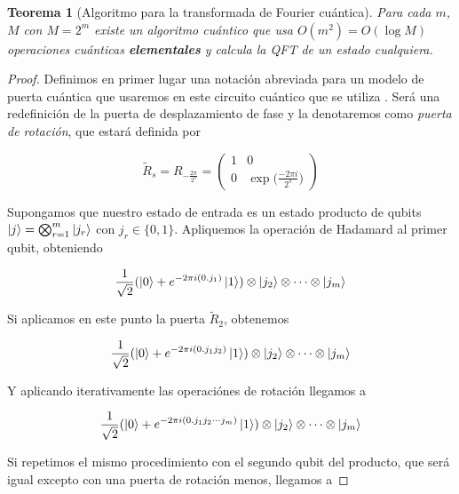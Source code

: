 \documentclass[11pt, spanish]{report}
\numberwithin{equation}{section}
\newtheorem{teo}[defin]{Teorema}
\numberwithin{defin}{section}
\newenvironment{yellowBox}{\begin{tcolorbox}[colback=yellow!5!white,colframe=yellow!75!black]}{\end{tcolorbox}}
\begin{document}
\begin{yellowBox}
\begin{teo}[Algoritmo para la transformada de Fourier cuántica]
Para cada $m$, $M$ con $M=2^m$ existe un algoritmo cuántico que usa $O(m^2)=O(\log M)$ operaciones cuánticas \textbf{elementales} y calcula la QFT de un estado cualquiera.
\end{teo}
\end{yellowBox}

\begin{proof}

Definimos en primer lugar una notación abreviada para un modelo de puerta cuántica que usaremos en este circuito cuántico que se utiliza \cite{shor}. Será una redefinición de la puerta de desplazamiento de fase y la denotaremos como \emph{puerta de rotación}, que estará definida por

\begin{equation}
\tilde{R}_s=R_{-\frac{2\pi}{2^s}}=\begin{pmatrix}
1 & 0 \\
0 & \exp\Big(\frac{-2\pi i}{2^s}\Big)
\end{pmatrix}
\end{equation}

Supongamos que nuestro estado de entrada es un estado producto de qubits $\ket{j}=\bigotimes_{r=1}^m\ket{j_r}$ con $j_r\in\{0,1\}$. Apliquemos la operación de Hadamard al primer qubit, obteniendo

\begin{equation}
\frac{1}{\sqrt{2}}(\ket{0}+e^{-2\pi i(0.j_1)}\ket{1})\otimes\ket{j_2}\otimes\cdots\otimes\ket{j_m}
\end{equation}

Si aplicamos en este punto la puerta $\tilde{R}_2$, obtenemos

\begin{equation}
\frac{1}{\sqrt{2}}(\ket{0}+e^{-2\pi i(0.j_1j_2)}\ket{1})\otimes\ket{j_2}\otimes\cdots\otimes\ket{j_m}
\end{equation}

Y aplicando iterativamente las operaciónes de rotación llegamos a 

\begin{equation}
\frac{1}{\sqrt{2}}(\ket{0}+e^{-2\pi i(0.j_1j_2\cdots j_m)}\ket{1})\otimes\ket{j_2}\otimes\cdots\otimes\ket{j_m}
\end{equation}

Si repetimos el mismo procedimiento con el segundo qubit del producto, que será igual excepto con una puerta de rotación menos, llegamos a 


\end{proof}
\end{document}
